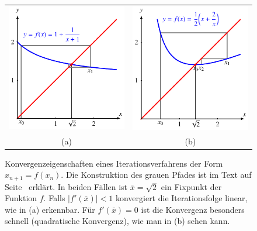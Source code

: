 \begin{figure}
\centering
\begin{tabular}{cc}
\includegraphics{chapters/1a-frames/images/ibkonv.pdf}&
\includegraphics{chapters/1a-frames/images/itkonv.pdf}\\
(a)&(b)
\end{tabular}
\caption{Konvergenzeigenschaften eines Iterationsverfahrens der Form
$x_{n+1}=f(x_n)$.
Die Konstruktion des grauen Pfades ist im Text auf
Seite~\pageref{frame:grauerpfad} erklärt.
In beiden Fällen ist $\bar{x}=\sqrt{2}$ ein Fixpunkt der Funktion $f$.
Falls $|f'(\bar{x})| < 1$ konvergiert die Iterationsfolge linear, wie in (a)
erkennbar.
Für $f'(\bar{x})=0$ ist die Konvergenz besonders schnell (quadratische
Konvergenz), wie man in (b) sehen kann.
\label{frame:iterationsvergleich}}
\end{figure}

